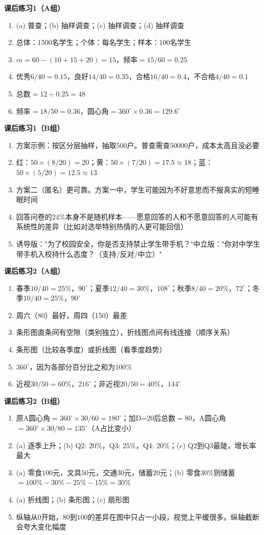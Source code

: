 
\textbf{课后练习1（A组）}
\begin{enumerate}
\item (a) 普查；(b) 抽样调查；(c) 抽样调查；(d) 抽样调查
\item 总体：$1500$名学生；个体：每名学生；样本：$100$名学生
\item $m=60-(10+15+20)=15$，频率$=15/60=0.25$
\item 优秀$6/40=0.15$，良好$14/40=0.35$，合格$16/40=0.4$，不合格$4/40=0.1$
\item 总数$=12\div0.25=48$
\item 频率$=18/50=0.36$，圆心角$=360^\circ\times0.36=129.6^\circ$
\end{enumerate}

\textbf{课后练习1（B组）}
\begin{enumerate}
\item 方案示例：按区分层抽样，抽取$500$户。普查需查$50000$户，成本太高且没必要
\item 红：$50\times(8/20)=20$；黄：$50\times(7/20)=17.5\approx18$；蓝：$50\times(5/20)=12.5\approx13$
\item 方案二（匿名）更可靠。方案一中，学生可能因为不好意思而不报真实的短睡眠时间
\item 回答问卷的$24\%$本身不是随机样本——愿意回答的人和不愿意回答的人可能有系统性的差异（比如对选举特别热情的人更可能回信）
\item 诱导版："为了校园安全，你是否支持禁止学生带手机？"中立版："你对中学生带手机入校持什么态度？（支持/反对/中立）"
\end{enumerate}

\textbf{课后练习2（A组）}
\begin{enumerate}
\item 春季$10/40=25\%$，$90^\circ$；夏季$12/40=30\%$，$108^\circ$；秋季$8/40=20\%$，$72^\circ$；冬季$10/40=25\%$，$90^\circ$
\item 周六（80）最好，周四（150）最差
\item 条形图直条间有空隙（类别独立），折线图点间有线连接（顺序关系）
\item 条形图（比较各季度）或折线图（看季度趋势）
\item $360^\circ$，因为各部分百分比之和为$100\%$
\item 近视$30/50=60\%$，$216^\circ$；非近视$20/50=40\%$，$144^\circ$
\end{enumerate}

\textbf{课后练习2（B组）}
\begin{enumerate}
\item 原A圆心角$=360^\circ\times30/60=180^\circ$；加D=20后总数$=80$，A圆心角$=360^\circ\times30/80=135^\circ$（A占比变小）
\item (a) 逐季上升；(b) Q2: $20\%$，Q3: $25\%$，Q4: $20\%$；(c) Q2到Q3最陡，增长率最大
\item (a) 零食$100$元，文具$50$元，交通$30$元，储蓄$20$元；(b) 零食$30\%$则储蓄$=100\%-30\%-25\%-15\%=30\%$
\item (a) 折线图；(b) 条形图；(c) 扇形图
\item 纵轴从$0$开始，$80$到$100$的差异在图中只占一小段，视觉上平缓很多。纵轴截断会夸大变化幅度
\end{enumerate}

